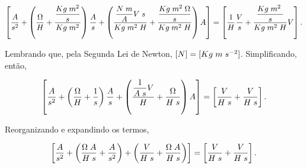 \documentclass{article}
\numberwithin{equation}{section}
\let\l\left
\let\r\right
\let\dfr\dfrac
\begin{document}
\begin{equation*}
    \l[ \dfr{A}{s^2} + \l( \dfr{\Omega}{H} + \dfr{\dfr{Kg \hspace{1mm} m^2}{s}}{Kg \hspace{1mm} m^2} \r) \dfr{A}{s} + \l( \dfr{\dfr{N \hspace{1mm} m}{A} V \hspace{1mm} s}{Kg \hspace{1mm} m^2 \hspace{1mm} H} + \dfr{\dfr{Kg \hspace{1mm} m^2 \hspace{1mm} \Omega}{s}}{Kg \hspace{1mm} m^2 \hspace{1mm} H} \r)A \r] = \l[ \dfr{1}{H}\dfr{V}{s}  + \dfr{\dfr{Kg \hspace{1mm} m^2 \hspace{1mm}}{s}}{Kg \hspace{1mm} m^2 \hspace{1mm} H}V\r].
\end{equation*}

\noindent Lembrando que, pela Segunda Lei de Newton, $[N] = [Kg \hspace{1mm} m \hspace{1mm}s^{-2}]$. Simplificando, então,

\begin{equation*}
    \l[ \dfr{A}{s^2} + \l( \dfr{\Omega}{H} + \dfr{1}{s}\r)\dfr{A}{s} + \l( \dfr{\dfr{1}{A \hspace{1mm} s} V}{H} + \dfr{\Omega}{H \hspace{1mm} s} \r) A \r] = \l[ \dfr{V}{H \hspace{1mm} s}  + \dfr{V}{H \hspace{1mm} s}\r].
\end{equation*}

\noindent Reorganizando e expandindo os termos,

\begin{equation*}
    \l[ \dfr{A}{s^2} + \l( \dfr{\Omega \hspace{1mm} A}{H \hspace{1mm} s} + \dfr{A}{s^2}\r) + \l( \dfr{V}{H \hspace{1mm} s} + \dfr{\Omega \hspace{1mm} A}{H \hspace{1mm} s} \r) \r] = \l[ \dfr{V}{H \hspace{1mm} s}  + \dfr{V}{H \hspace{1mm} s}\r].
\end{equation*}
\end{document}
